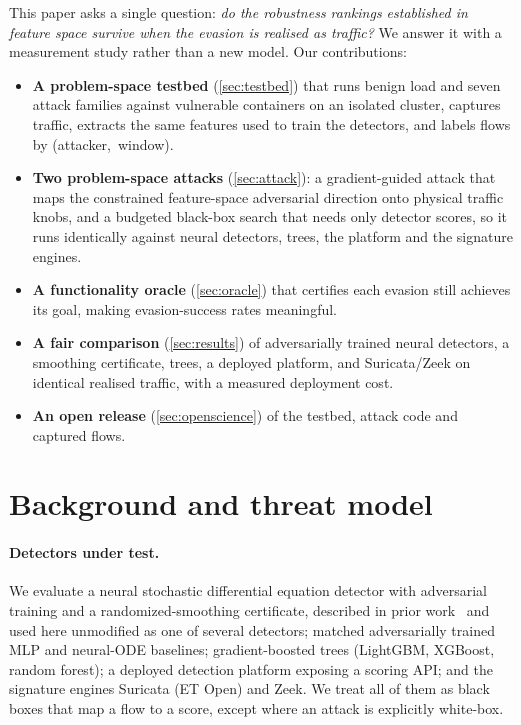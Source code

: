 \documentclass[letterpaper,twocolumn,10pt]{article}
\begin{document}
This paper asks a single question: \emph{do the robustness rankings established
in feature space survive when the evasion is realised as traffic?} We answer it
with a measurement study rather than a new model. Our contributions:
\begin{itemize}
\item \textbf{A problem-space testbed} (\cref{sec:testbed}) that runs benign load
and seven attack families against vulnerable containers on an isolated cluster,
captures traffic, extracts the same features used to train the detectors, and
labels flows by \mbox{(attacker, window)}.
\item \textbf{Two problem-space attacks} (\cref{sec:attack}): a gradient-guided
attack that maps the constrained feature-space adversarial direction onto
physical traffic knobs, and a budgeted black-box search that needs only detector
scores, so it runs identically against neural detectors, trees, the platform and
the signature engines.
\item \textbf{A functionality oracle} (\cref{sec:oracle}) that certifies each
evasion still achieves its goal, making evasion-success rates meaningful.
\item \textbf{A fair comparison} (\cref{sec:results}) of adversarially trained
neural detectors, a smoothing certificate, trees, a deployed platform, and
Suricata/Zeek on identical realised traffic, with a measured deployment cost.
\item \textbf{An open release} (\cref{sec:openscience}) of the testbed, attack
code and captured flows.
\end{itemize}

\section{Background and threat model}\label{sec:threat}
\paragraph{Detectors under test.} We evaluate a neural stochastic differential
equation detector with adversarial training and a randomized-smoothing
certificate, described in prior work~\cite{anon-featurespace} and used here
unmodified as one of several detectors; matched adversarially trained MLP and
neural-ODE baselines; gradient-boosted trees (LightGBM, XGBoost, random forest);
a deployed detection platform exposing a scoring API; and the signature engines
Suricata (ET Open) and Zeek. We treat all of them as black boxes that map a flow
to a score, except where an attack is explicitly white-box.
\end{document}
